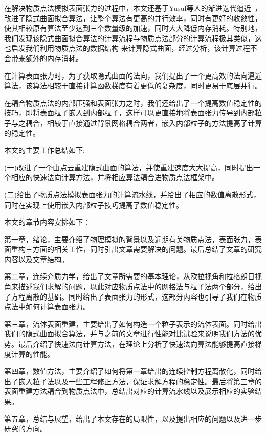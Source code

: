 在解决物质点法模拟表面张力的过程中，本文还基于Yusuf等人的渐进迭代逼近~\cite{hamza2020implicit}，改进了隐式曲面拟合算法，让整个算法有更高的并行效率，同时有更好的收敛性，使其相较原有算法至少达到三个数量级的加速，同时大大降低内存消耗。特别地，我们发现该隐式曲面拟合算法的计算流程与物质点法部分的计算流程极其类似，这也启发我们利用物质点法的数据结构
来计算隐式曲面，经过分析，该计算过程不会带来额外的内存消耗。

在计算表面张力时，为了获取隐式曲面的法向，我们提出了一个更高效的法向逼近算法，该算法相较于直接计算函数梯度有着更低的复杂度，同时更易于底层并行。

在耦合物质点法的内部压强和表面张力之时，我们还给出了一个提高数值稳定性的技巧，即将表面粒子嵌入到内部粒子，这样可以更直接地将表面张力传导到内部粒子与之耦合，相较于直接通过背景网格耦合两者，嵌入内部粒子的方法提高了计算的稳定性。

本文的主要工作总结如下:

(一)改进了一个由点云重建隐式曲面的算法，并使重建速度大大提高，同时提出一个相应的快速法向计算方法，并将相应算法耦合进物质点法框架中。

(二)给出了物质点法模拟表面张力的计算流水线，并给出了相应的数值离散形式，同时在实现上使用嵌入内部粒子技巧提高了数值稳定性。

本文的章节内容安排如下：

    第一章，绪论，主要介绍了物理模拟的背景以及近期有关物质点法，表面张力，表面重构三方面的相关工作，同时引出文章需要解决的问题。最后总结了文章的研究内容以及文章结构。

    第二章，连续介质力学，给出了文章所需要的基本理论，从欧拉视角和拉格朗日视角来描述我们求解的问题，以此对应物质点法中的网格法与粒子法两个部分，给出了方程离散的基础。同时给出了表面张力的形式，这部分内容也引导了我们在物质点法中如何计算表面张力。

    第三章，流体表面重建，主要给出了如何构造一个粒子表示的流体表面。同时给出我们的隐式曲面拟合算法，并与之前的文章进行性能对比试验来说明我们方法的优势。最后介绍了快速法向计算方法，在理论上分析了快速法向算法能够提高直接梯度计算的性能。

    第四章，数值方法，主要介绍了如何将第一章给出的连续控制方程离散化，同时给出了嵌入粒子法以及一些工程修正方法，保证求解方程的稳定性。最后将第三章的表面重建方法耦合到物质点法中，总结出对应的计算流水线以及展示相应的实验结果。

    第五章，总结与展望，给出了本文存在的局限性，以及提出相应的问题以及进一步研究的方向。
